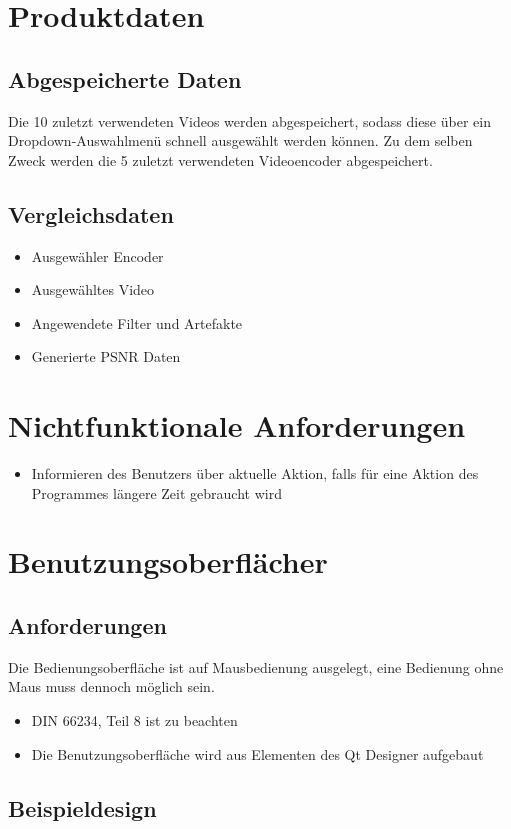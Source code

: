 \documentclass[parskip=full]{scrartcl}
\begin{document}
\section{Produktdaten}
\subsection{Abgespeicherte Daten}
Die 10 zuletzt verwendeten Videos werden abgespeichert, sodass diese über ein Dropdown-Auswahlmenü schnell ausgewählt werden können. Zu dem selben Zweck werden die 5 zuletzt verwendeten Videoencoder abgespeichert.
\subsection{Vergleichsdaten}
\begin{itemize}
\item Ausgewähler Encoder
\item Ausgewähltes Video
\item Angewendete Filter und Artefakte
\item Generierte PSNR Daten
\end{itemize}
\newpage
\section{Nichtfunktionale Anforderungen}
\begin{itemize}
\item Informieren des Benutzers über aktuelle Aktion, falls für eine Aktion des Programmes längere Zeit gebraucht wird
\end{itemize}
\newpage
\section{Benutzungsoberflächer}
\subsection{Anforderungen}
Die Bedienungsoberfläche ist auf Mausbedienung ausgelegt, eine Bedienung ohne Maus muss dennoch möglich sein.
\begin{itemize}
\item DIN 66234, Teil 8 ist zu beachten
\item Die Benutzungsoberfläche wird aus Elementen des Qt Designer aufgebaut
\end{itemize}
\subsection{Beispieldesign}
\end{document}
